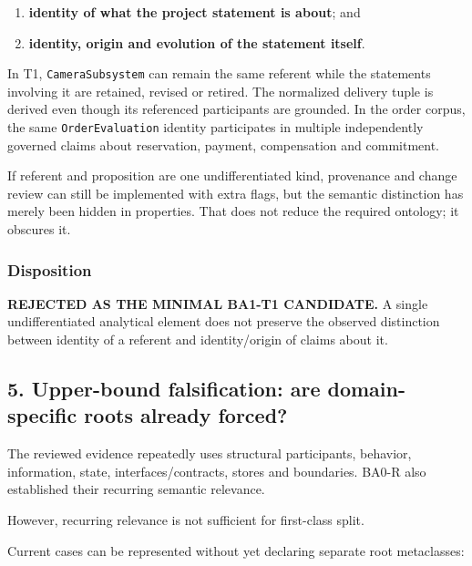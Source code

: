 \documentclass[
]{article}
\providecommand{\tightlist}{%
  \setlength{\itemsep}{0pt}\setlength{\parskip}{0pt}}
\begin{document}
\begin{enumerate}
\def\labelenumi{\arabic{enumi}.}
\tightlist
\item
  \textbf{identity of what the project statement is about}; and
\item
  \textbf{identity, origin and evolution of the statement itself}.
\end{enumerate}

In T1, \texttt{CameraSubsystem} can remain the same referent while the
statements involving it are retained, revised or retired. The normalized
delivery tuple is derived even though its referenced participants are
grounded. In the order corpus, the same \texttt{OrderEvaluation}
identity participates in multiple independently governed claims about
reservation, payment, compensation and commitment.

If referent and proposition are one undifferentiated kind, provenance
and change review can still be implemented with extra flags, but the
semantic distinction has merely been hidden in properties. That does not
reduce the required ontology; it obscures it.

\subsubsection{Disposition}\label{disposition}

\textbf{REJECTED AS THE MINIMAL BA1-T1 CANDIDATE.} A single
undifferentiated analytical element does not preserve the observed
distinction between identity of a referent and identity/origin of claims
about it.

\subsection{5. Upper-bound falsification: are domain-specific roots
already
forced?}\label{5-upper-bound-falsification-are-domain-specific-roots-already-forced}

The reviewed evidence repeatedly uses structural participants, behavior,
information, state, interfaces/contracts, stores and boundaries. BA0-R
also established their recurring semantic relevance.

However, recurring relevance is not sufficient for first-class split.

Current cases can be represented without yet declaring separate root
metaclasses:
\end{document}
